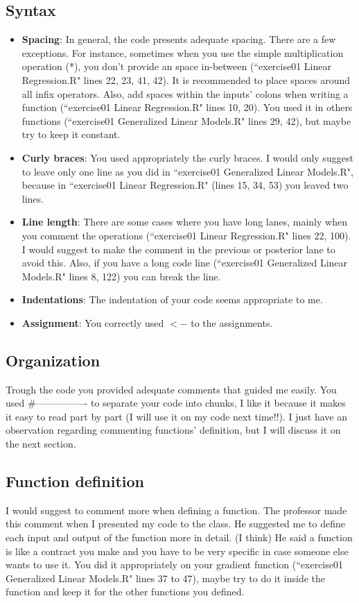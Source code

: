 \documentclass[11 pt]{article}
\begin{document}
\subsection{Syntax}
\begin{itemize}
	\item \textbf{Spacing}: In general, the code presents adequate spacing. There are a few exceptions. For instance, sometimes when you use the simple multiplication operation (*), you don't provide an space in-between (``exercise01 Linear Regression.R" lines 22, 23, 41, 42). It is recommended to place spaces around all infix operators. Also, add spaces within the inputs' colons when writing a function (``exercise01 Linear Regression.R" lines 10, 20). You used it in others functions (``exercise01 Generalized Linear Models.R" lines 29, 42), but maybe try to keep it constant.
	\item \textbf{Curly braces}: You used appropriately the curly braces. I would only suggest to leave only one line as you did in ``exercise01 Generalized Linear Models.R", because in ``exercise01 Linear Regression.R" (lines 15, 34, 53) you leaved two lines.
	\item \textbf{Line length}: There are some cases where you have long lanes, mainly when you comment the operations (``exercise01 Linear Regression.R" lines 22, 100). I would suggest to make the comment in the previous or posterior lane to avoid this. Also, if you have a long code line (``exercise01 Generalized Linear Models.R" lines 8, 122) you can break the line.
	\item \textbf{Indentations}: The indentation of your code seems appropriate to me.
	\item \textbf{Assignment}: You correctly used $<-$ to the assignments.
\end{itemize}

\subsection{Organization}
Trough the code you provided adequate comments that guided me easily. You used \#---------------- to separate your code into chunks, I like it because it makes it easy to read part by part (I will use it on my code next time!!). I just have an observation regarding commenting functions' definition, but I will discuss it on the next section. 

\subsection{Function definition}
I would suggest to comment more when defining a function. The professor made this comment when I presented my code to the class. He suggested me to define  each input and output of the function more in detail. (I think) He said a function is like a contract you make and you have to be very specific in case someone else wants to use it. You did it appropriately on your gradient function (``exercise01 Generalized Linear Models.R" lines 37 to 47), maybe try to do it inside the function and keep it for the other functions you defined. 
\end{document}
